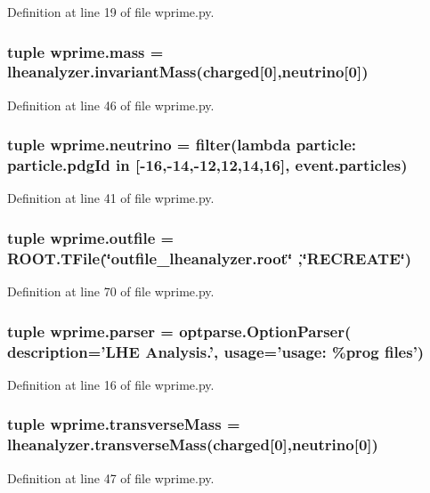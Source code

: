 Definition at line 19 of file wprime.\-py.

\subsubsection[{mass}]{\setlength{\rightskip}{0pt plus 5cm}tuple wprime.\-mass = {\bf lheanalyzer.\-invariant\-Mass}({\bf charged}\mbox{[}0\mbox{]},{\bf neutrino}\mbox{[}0\mbox{]})}\label{namespacewprime_ad374268a3fa087dcdcb8aa73f71685b6}


Definition at line 46 of file wprime.\-py.

\subsubsection[{neutrino}]{\setlength{\rightskip}{0pt plus 5cm}tuple wprime.\-neutrino = filter(lambda particle\-: particle.\-pdg\-Id in \mbox{[}-\/16,-\/14,-\/12,12,14,16\mbox{]}, event.\-particles)}\label{namespacewprime_aa30022404f607643027f776a815f22e8}


Definition at line 41 of file wprime.\-py.

\subsubsection[{outfile}]{\setlength{\rightskip}{0pt plus 5cm}tuple wprime.\-outfile = R\-O\-O\-T.\-T\-File(\char`\"{}outfile\-\_\-lheanalyzer.\-root\char`\"{} ,\char`\"{}R\-E\-C\-R\-E\-A\-T\-E\char`\"{})}\label{namespacewprime_abc2eda51ac0db27e451c75e1841c7c68}


Definition at line 70 of file wprime.\-py.

\subsubsection[{parser}]{\setlength{\rightskip}{0pt plus 5cm}tuple wprime.\-parser = optparse.\-Option\-Parser( description='L\-H\-E Analysis.', usage='usage\-: \%prog files')}\label{namespacewprime_a63569f7a72dfda59eb510ce76651466c}


Definition at line 16 of file wprime.\-py.

\subsubsection[{transverse\-Mass}]{\setlength{\rightskip}{0pt plus 5cm}tuple wprime.\-transverse\-Mass = lheanalyzer.\-transverse\-Mass({\bf charged}\mbox{[}0\mbox{]},{\bf neutrino}\mbox{[}0\mbox{]})}\label{namespacewprime_ab689ae92a992d53349486936abb75b2e}


Definition at line 47 of file wprime.\-py.

